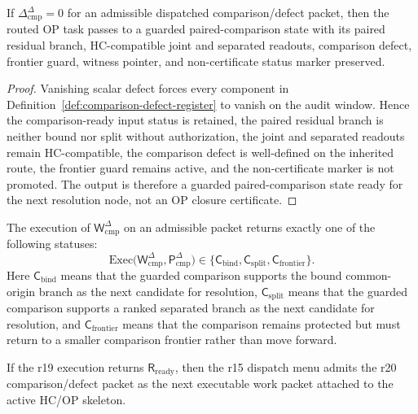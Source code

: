 \begin{lemma}
\label{lem:zero-comparison-defect-preserves-paired-comparison-data}
If \(\Delta_{\mathrm{cmp}}^{\Delta}=0\) for an admissible dispatched comparison/defect packet, then the routed OP task passes to a guarded paired-comparison state with its paired residual branch, HC-compatible joint and separated readouts, comparison defect, frontier guard, witness pointer, and non-certificate status marker preserved.
\end{lemma}

\begin{proof}
Vanishing scalar defect forces every component in Definition~\ref{def:comparison-defect-register} to vanish on the audit window.  Hence the comparison-ready input status is retained, the paired residual branch is neither bound nor split without authorization, the joint and separated readouts remain HC-compatible, the comparison defect is well-defined on the inherited route, the frontier guard remains active, and the non-certificate marker is not promoted.  The output is therefore a guarded paired-comparison state ready for the next resolution node, not an OP closure certificate.
\end{proof}

\begin{definition}
\label{def:r20-comparison-defect-return}
The execution of \(\mathsf W_{\mathrm{cmp}}^{\Delta}\) on an admissible packet returns exactly one of the following statuses:
\[
\mathrm{Exec}\bigl(\mathsf W_{\mathrm{cmp}}^{\Delta},
                   \mathsf P_{\mathrm{cmp}}^{\Delta}\bigr)
\in
\{\mathsf C_{\mathrm{bind}},\mathsf C_{\mathrm{split}},\mathsf C_{\mathrm{frontier}}\}.
\]
Here \(\mathsf C_{\mathrm{bind}}\) means that the guarded comparison supports the bound common-origin branch as the next candidate for resolution, \(\mathsf C_{\mathrm{split}}\) means that the guarded comparison supports a ranked separated branch as the next candidate for resolution, and \(\mathsf C_{\mathrm{frontier}}\) means that the comparison remains protected but must return to a smaller comparison frontier rather than move forward.
\end{definition}

\begin{proposition}
\label{prop:dispatched-comparison-defect-packet-admissible}
If the r19 execution returns \(\mathsf R_{\mathrm{ready}}\), then the r15 dispatch menu admits the r20 comparison/defect packet as the next executable work packet attached to the active HC/OP skeleton.
\end{proposition}


